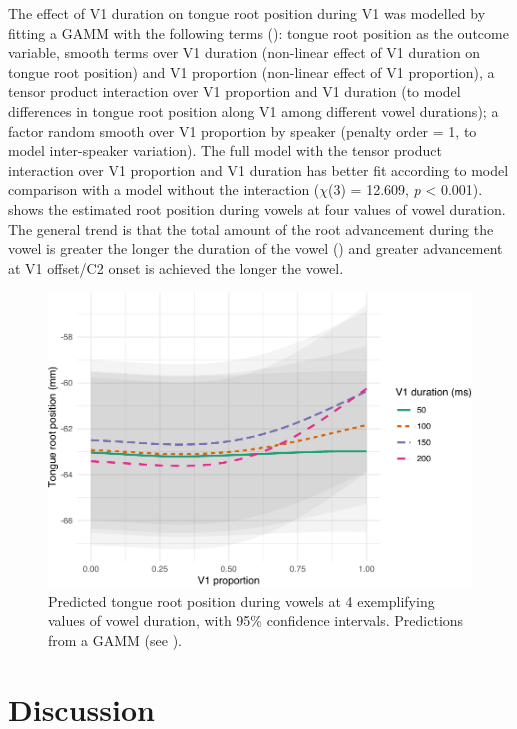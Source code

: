 \documentclass[preprint]{JASAnew}
\begin{document}
\label{s:trp-v1-dur}

The effect of V1 duration on tongue root position during V1 was modelled
by fitting a GAMM with the following terms
(): tongue root position as the outcome
variable, smooth terms over V1 duration (non-linear effect of V1
duration on tongue root position) and V1 proportion (non-linear effect
of V1 proportion), a tensor product interaction over V1 proportion and
V1 duration (to model differences in tongue root position along V1 among
different vowel durations); a factor random smooth over V1 proportion by
speaker (penalty order = 1, to model inter-speaker variation). The full
model with the tensor product interaction over V1 proportion and V1
duration has better fit according to model comparison with a model
without the interaction (\(\chi\)(3) = 12.609, \emph{p} \textless{}
0.001).  shows the estimated root position during vowels
at four values of vowel duration. The general trend is that the total
amount of the root advancement during the vowel is greater the longer
the duration of the vowel () and greater advancement at
V1 offset/C2 onset is achieved the longer the vowel.

\begin{figure}
\includegraphics[width=\linewidth]{./Figure6} \caption{Predicted tongue root position during vowels at 4 exemplifying values of vowel duration, with 95\% confidence intervals. Predictions from a GAMM (see ).}\label{f:Figure6}
\end{figure}

\hypertarget{discussion}{%
\section{Discussion}\label{discussion}}
\end{document}
